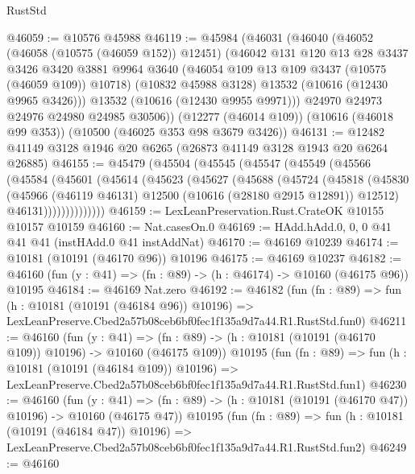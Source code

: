 \begin{lexlean}{RustStd}
\begin{coremodule}
@46059 := @10576 @45988
@46119 := @45984
    (@46031
      (@46040
        (@46052
          (@46058 (@10575 (@46059 @152)) @12451)
          (@46042
            @131
            @120
            @13
            @28
            @3437
            @3426
            @3420
            @3881
            @9964
            @3640
            (@46054 @109 @13 @109 @3437 (@10575 (@46059 @109)) @10718)
            (@10832 @45988 @3128)
            @13532
            (@10616 (@12430 @9965 @3426)))
          @13532
          (@10616 (@12430 @9955 @9971)))
        @24970
        @24973
        @24976
        @24980
        @24985
        @30506))
    (@12277 (@46014 @109))
    (@10616 (@46018 @99 @353))
    (@10500 (@46025 @353 @98 @3679 @3426))
@46131 := @12482 @41149 @3128 @1946 @20 @6265 (@26873 @41149 @3128 @1943 @20 @6264 @26885)
@46155 := @45479
    (@45504
      (@45545
        (@45547
          (@45549
            (@45566
              (@45584
                (@45601
                  (@45614
                    (@45623
                      (@45627
                        (@45688
                          (@45724
                            (@45818
                              (@45830
                                (@45966
                                  (@46119 @46131)
                                  @12500
                                  (@10616 (@28180 @2915 @12891))
                                  @12512)
                                @46131))))))))))))))
@46159 := LexLeanPreservation.Rust.CrateOK @10155 @10157 @10159
@46160 := Nat.casesOn.{0}
@46169 := HAdd.hAdd.{0, 0, 0} @41 @41 @41 (instHAdd.{0} @41 instAddNat)
@46170 := @46169 @10239
@46174 := @10181 (@10191 (@46170 @96)) @10196
@46175 := @46169 @10237
@46182 := @46160 (fun (y : @41) => (fn : @89) -> (h : @46174) -> @10160 (@46175 @96)) @10195
@46184 := @46169 Nat.zero
@46192 := @46182
    (fun (fn : @89) =>
    fun (h : @10181 (@10191 (@46184 @96)) @10196) =>
    LexLeanPreserve.Cbed2a57b08ceb6bf0fec1f135a9d7a44.R1.RustStd.fun0)
@46211 := @46160
    (fun (y : @41) =>
    (fn : @89) -> (h : @10181 (@10191 (@46170 @109)) @10196) -> @10160 (@46175 @109))
    @10195
    (fun (fn : @89) =>
    fun (h : @10181 (@10191 (@46184 @109)) @10196) =>
    LexLeanPreserve.Cbed2a57b08ceb6bf0fec1f135a9d7a44.R1.RustStd.fun1)
@46230 := @46160
    (fun (y : @41) =>
    (fn : @89) -> (h : @10181 (@10191 (@46170 @47)) @10196) -> @10160 (@46175 @47))
    @10195
    (fun (fn : @89) =>
    fun (h : @10181 (@10191 (@46184 @47)) @10196) =>
    LexLeanPreserve.Cbed2a57b08ceb6bf0fec1f135a9d7a44.R1.RustStd.fun2)
@46249 := @46160

\end{coremodule}
\end{lexlean}
